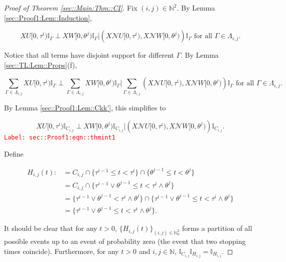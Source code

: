 \documentclass[12pt]{article}
\newcommand{\mb}{\mathbb}
\newcommand{\mc}{\mathcal}
\newcommand{\te}{\text}
\newcommand{\tr}{\textcolor{red}}
\newcommand{\labe}[1]{\tr{\texttt{Label: #1}}}
\renewcommand{\U}{U}							%
\newcommand{\UU}{W}								%
\renewcommand{\t}{t}							%
\newcommand{\X}{X}								%
\newcommand{\neigh}{\mc{N}}						%
\newcommand{\rt}[1]{\tau^{#1}}						%
\newcommand{\rtt}[1]{\theta^{#1}}					%
\newcommand{\itt}{i}								%
\newcommand{\ittt}{j}								%
\newcommand{\apath}{\Gamma}						%
\newcommand{\pathset}[2]{\Lambda_{#1,#2}}			%
\newcommand{\pathsete}[2]{C_{#1,#2}}			%
\newcommand{\pathseted}[2]{H_{#1,#2}}			%
\begin{document}
\begin{proof}[Proof of Theorem \ref{sec::Main:Thm::CI}]

Fix \((\itt,\ittt) \in \mb{N}^2\). By Lemma \ref{sec::Proof1:Lem::Induction}, 

\[\X{\U}{[0,\rt{\itt})}\mb{I}_{\apath}\perp \X{\UU}{[0,\rtt{\ittt})}\mb{I}_{\apath}\big|\left(\X{\neigh{\U}}{[0,\rt{\itt})},\X{\neigh{\UU}}{[0,\rtt{\ittt})}\right)\mb{I}_{\apath}\te{ for all }\apath \in \pathset{\itt}{\ittt}.\]

Notice that all terms have disjoint support for different \(\apath\). By Lemma \ref{sec::TL:Lem::Props}(f), 

\[\sum_{\apath\in\pathset{\itt}{\ittt}}\X{\U}{[0,\rt{\itt})}\mb{I}_{\apath}\perp \sum_{\apath\in\pathset{\itt}{\ittt}}\X{\UU}{[0,\rtt{\ittt})}\mb{I}_{\apath}\bigg|\sum_{\apath\in\pathset{\itt}{\ittt}}\left(\X{\neigh{\U}}{[0,\rt{\itt})},\X{\neigh{\UU}}{[0,\rtt{\ittt})}\right)\mb{I}_{\apath}\te{ for all }\apath \in \pathset{\itt}{\ittt}.\]

By Lemma \ref{sec::Proof1:Lem::Ckk'}, this simplifies to 

\begin{equation}
\X{\U}{[0,\rt{\itt})}\mb{I}_{\pathsete{\itt}{\ittt}}\perp \X{\UU}{[0,\rtt{\ittt})}\mb{I}_{\pathsete{\itt}{\ittt}}\big|\left(\X{\neigh{\U}}{[0,\rt{\itt})},\X{\neigh{\UU}}{[0,\rtt{\ittt})}\right)\mb{I}_{\pathsete{\itt}{\ittt}}.
\label{sec::Proof1:eqn::thmint1}
\end{equation}
\labe{sec::Proof1:eqn::thmint1}

Define

\begin{align*}
\pathseted{\itt}{\ittt}(\t) :&= \pathsete{\itt}{\ittt}\cap \{\rt{\itt-1}\leq \t < \rt{\itt}\}\cap \{\rtt{\ittt-1} \leq \t < \rtt{\ittt}\}\\
&=\pathsete{\itt}{\ittt}\cap\{\rt{\itt-1}\vee\rtt{\ittt-1} \leq \t < \rt{\itt}\wedge \rtt{\ittt}\}\\
&=\{\rt{\itt-1}\vee\rtt{\ittt-1}  < \rt{\itt}\wedge \rtt{\ittt}\} \cap \{\rt{\itt-1}\vee\rtt{\ittt-1} \leq \t < \rt{\itt}\wedge \rtt{\ittt}\}\\
&= \{\rt{\itt-1}\vee\rtt{\ittt-1} \leq \t < \rt{\itt}\wedge \rtt{\ittt}\}.
\end{align*}

It should be clear that for any \(\t > 0\), \(\{\pathseted{\itt}{\ittt}(\t)\}_{(\itt,\ittt)\in\mb{N}_0^2}\) forms a partition of all possible events up to an event of probability zero (the event that two stopping times coincide). Furthermore, for any \(t > 0\) and \(\itt,\ittt\in \mb{N}\), \(\mb{I}_{\pathsete{\itt}{\ittt}}\mb{I}_{\pathseted{\itt}{\ittt}} = \mb{I}_{\pathseted{\itt}{\ittt}}\).


\end{proof}
\end{document}
